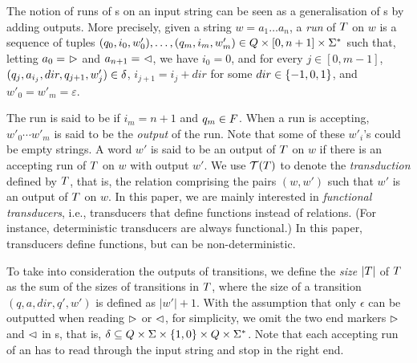 %
%
The notion of runs of \FFT{}s on an input string can be seen as a generalisation 
of \FFA{}s by adding outputs. More precisely, given a string $w = a_1 \dots a_n$, a \emph{run} of $T$ on $w$
is a sequence of tuples $(q_0, i_0, w'_0),\ldots, (q_m, i_m, w'_m) \in Q \times
[0, n+1] \times \Sigma^*$ 
such that, letting $a_0 =\ \vartriangleright$ and $a_{n+1} =\ \vartriangleleft$, 
we have $i_0 = 0$, and  for every $j \in [0, m-1]$, $(q_j, a_{i_j}, dir, q_{j+1}, w'_j) \in
        \delta$, $i_{j+1} = i_j + dir$ for some $dir \in \{-1, 0, 1\}$, and $w'_0 = w'_m = \varepsilon$.
 
The run is said to be  if $i_m = n+1$ and $q_m \in F$.
When a run is accepting, $w'_0 \cdots w'_m$ is said to be the \emph{output} of the
run. Note that some of these $w'_i$'s could be empty strings.
A word $w'$ is said to be an output of $T$ on $w$ if there is an accepting run of
$T$ on $w$ with output $w'$. We use $\mathcal{T}(T)$ to denote the
\emph{transduction} defined by $T$, that is, the relation comprising
the pairs $(w,w')$ such that $w'$ is an output of $T$ on $w$. 
In this paper, we are mainly interested in \emph{functional
transducers}, i.e., transducers that define functions instead of relations. (For instance, deterministic transducers are always functional.) In this paper, transducers 
define functions, but can be non-deterministic.

To take into consideration the outputs of transitions, we define the \emph{size} $|T|$ of $T$ as the sum of the sizes of transitions in $T$, where the size of a transition $(q, a, dir, q', w')$ is defined as $|w'|+1$. With the assumption that only $\epsilon$ can be outputted when reading $\vartriangleright$ or $\vartriangleleft$, for simplicity, we omit the two end markers $\vartriangleright$ and $\vartriangleleft$ in \FT{}s, that is, $\delta \subseteq Q \times \Sigma \times \{1,0\} \times Q \times \Sigma^*$. Note that each accepting run of an \FT{} has to read through the input string and stop in the right end.


